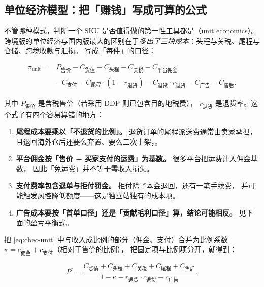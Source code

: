 \subsection{单位经济模型：把「赚钱」写成可算的公式}

不管哪种模式，判断一个 SKU 是否值得做的第一性工具都是（unit economics）。
跨境版的单位经济与国内版最大的区别在于\emph{多出了三块成本}：头程与关税、尾程与仓储、跨境收款与汇损。
写成「每件」的口径：

\begin{equation}
\begin{aligned}
\pi_{\text{unit}} ={}& P_{\text{售价}} - C_{\text{货值}} - C_{\text{头程}} - C_{\text{关税}} - C_{\text{平台佣金}} \\
&- C_{\text{支付}} - C_{\text{尾程}} \cdot (1-r_{\text{退货}}) - C_{\text{退货}} \cdot r_{\text{退货}} - C_{\text{广告}} - C_{\text{售后}} .
\end{aligned}
\label{eq:cbec-unit}
\end{equation}

其中 $P_{\text{售价}}$ 是含税售价（若采用 DDP 则已包含目的地税费），
$r_{\text{退货}}$ 是退货率。这个式子有四个容易算错的地方：

\begin{enumerate}
  \item \textbf{尾程成本要乘以「不退货的比例」。} 退货订单的尾程派送费通常由卖家承担，
        且退回海外仓后还要么弃置、要么二次上架，。
  \item \textbf{平台佣金按「售价 + 买家支付的运费」为基数。} 很多平台把运费计入佣金基数，
        因此「免运费」并不等于零收入损失。
  \item \textbf{支付费率包含退单与拒付罚金。} 拒付除了本金退回，还有一笔手续费，
        并可能触发风控降低额度——这是独立站独有的成本项。
  \item \textbf{广告成本要按「首单口径」还是「贡献毛利口径」算，结论可能相反。}
        见下面的盈亏平衡式。
\end{enumerate}

把 \cref{eq:cbec-unit} 中与收入成比例的部分（佣金、支付）合并为比例系数
$\kappa = c_{\text{佣金}} + c_{\text{支付}}$（相对于售价的比例），
把固定项与比例项分开，就得到：

\begin{equation}
P^{*} = \frac{C_{\text{货值}} + C_{\text{头程}} + C_{\text{关税}} + C_{\text{尾程}} + C_{\text{售后}}}
{1 - \kappa - r_{\text{退货}} \cdot c_{\text{退货}} - c_{\text{广告}}} .
\label{eq:cbec-breakeven}
\end{equation}

